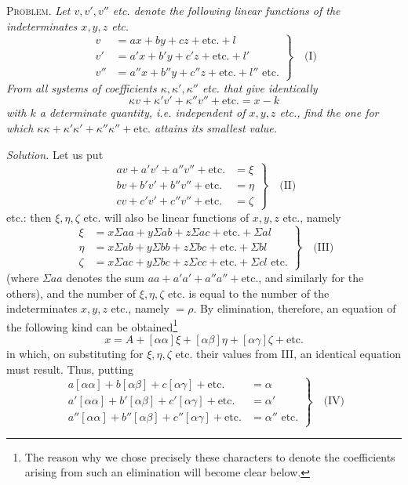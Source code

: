 \textsc{Problem.} \textit{Let \(v,v',v''\) etc. denote the following linear functions of the indeterminates \(x,y,z\) etc.}
\[
\left.\begin{aligned}
v&=ax+by+cz+\text{etc.}+l\\
v'&=a'x+b'y+c'z+\text{etc.}+l'\\
v''&=a''x+b''y+c''z+\text{etc.}+l''\text{ etc.}
\end{aligned}\right\}\quad\text{(I)}
\]
\textit{From all systems of coefficients \(\kappa,\kappa',\kappa''\) etc. that give identically}
\[
\kappa v+\kappa'v'+\kappa''v''+\text{etc.}=x-k
\]
\textit{with \(k\) a determinate quantity, i.e. independent of \(x,y,z\) etc., find the one for which \(\kappa\kappa+\kappa'\kappa'+\kappa''\kappa''+\text{etc.}\) attains its smallest value.}

\textit{Solution.} Let us put
\[
\left.\begin{aligned}
av+a'v'+a''v''+\text{etc.}&=\xi\\
bv+b'v'+b''v''+\text{etc.}&=\eta\\
cv+c'v'+c''v''+\text{etc.}&=\zeta
\end{aligned}\right\}\quad\text{(II)}
\]
etc.: then \(\xi,\eta,\zeta\) etc. will also be linear functions of \(x,y,z\) etc., namely
\[
\left.\begin{aligned}
\xi&=x\Sigma aa+y\Sigma ab+z\Sigma ac+\text{etc.}+\Sigma al\\
\eta&=x\Sigma ab+y\Sigma bb+z\Sigma bc+\text{etc.}+\Sigma bl\\
\zeta&=x\Sigma ac+y\Sigma bc+z\Sigma cc+\text{etc.}+\Sigma cl\text{ etc.}
\end{aligned}\right\}\quad\text{(III)}
\]
(where \(\Sigma aa\) denotes the sum \(aa+a'a'+a''a''+\text{etc.}\), and similarly for the others), and the number of \(\xi,\eta,\zeta\) etc. is equal to the number of the indeterminates \(x,y,z\) etc., namely \(=\rho\). By elimination, therefore, an equation of the following kind can be obtained\footnote{The reason why we chose precisely these characters to denote the coefficients arising from such an elimination will become clear below.}
\[
x=A+[\alpha\alpha]\xi+[\alpha\beta]\eta+[\alpha\gamma]\zeta+\text{etc.}
\]
in which, on substituting for \(\xi,\eta,\zeta\) etc. their values from III, an identical equation must result. Thus, putting
\[
\left.\begin{aligned}
a[\alpha\alpha]+b[\alpha\beta]+c[\alpha\gamma]+\text{etc.}&=\alpha\\
a'[\alpha\alpha]+b'[\alpha\beta]+c'[\alpha\gamma]+\text{etc.}&=\alpha'\\
a''[\alpha\alpha]+b''[\alpha\beta]+c''[\alpha\gamma]+\text{etc.}&=\alpha''\text{ etc.}
\end{aligned}\right\}\quad\text{(IV)}
\]
